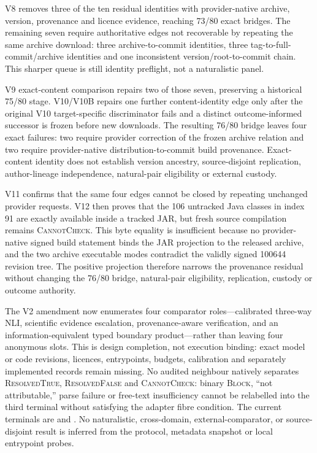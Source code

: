 V8 removes three of the ten residual identities with provider-native archive,
version, provenance and licence evidence, reaching 73/80 exact bridges. The
remaining seven require authoritative edges not recoverable by repeating the
same archive download: three archive-to-commit identities, three tag-to-full-
commit/archive identities and one inconsistent version/root-to-commit chain.
This sharper queue is still identity preflight, not a naturalistic panel.

V9 exact-content comparison repairs two of those seven, preserving a historical
75/80 stage.  V10/V10B repairs one further content-identity edge only after the
original V10 target-specific discriminator fails and a distinct outcome-informed
successor is frozen before new downloads.  The resulting 76/80 bridge leaves
four exact failures: two require provider correction of the frozen archive
relation and two require provider-native distribution-to-commit build
provenance.  Exact-content identity does not establish version ancestry,
source-disjoint replication, author-lineage independence, natural-pair
eligibility or external custody.

V11 confirms that the same four edges cannot be closed by repeating unchanged
provider requests.  V12 then proves that the 106 untracked Java classes in
index 91 are exactly available inside a tracked JAR, but fresh source
compilation remains \textsc{CannotCheck}.  This byte equality is insufficient
because no provider-native signed build statement binds the JAR projection to
the released archive, and the two archive executable modes contradict the
validly signed 100644 revision tree.  The positive projection therefore
narrows the provenance residual without changing the 76/80 bridge, natural-pair
eligibility, replication, custody or outcome authority.

The V2 amendment now enumerates four comparator roles---calibrated three-way
NLI, scientific evidence escalation, provenance-aware verification, and an
information-equivalent typed boundary product---rather than leaving four
anonymous slots.  This is design completion, not execution binding: exact model
or code revisions, licences, entrypoints, budgets, calibration and separately
implemented records remain missing. No audited neighbour natively separates \textsc{ResolvedTrue},
\textsc{ResolvedFalse} and \textsc{CannotCheck}: binary \textsc{Block}, ``not
attributable,'' parse failure or free-text insufficiency cannot be relabelled
into the third terminal without satisfying the adapter fibre condition. The
current terminals are
 and
. No naturalistic, cross-domain,
external-comparator, or source-disjoint result is inferred from the protocol,
metadata snapshot or local entrypoint probes.

